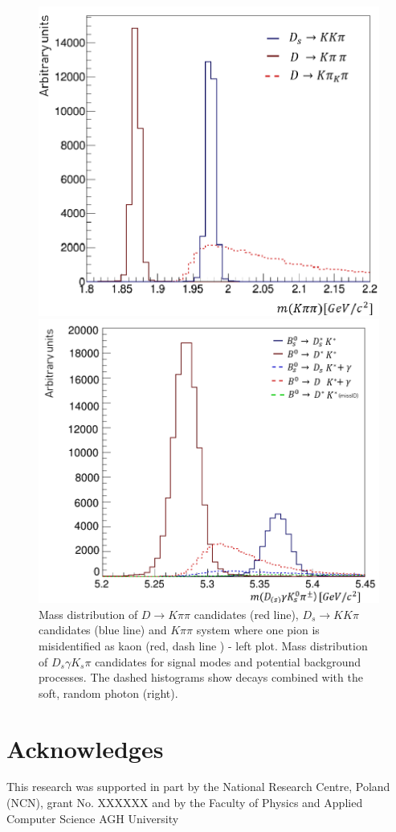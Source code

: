 \documentclass{appolb}
\begin{document}
\begin{figure}[h!]
\begin{minipage}{0.5\textwidth}
  \centering
\includegraphics[width=6.2 cm]{D3.png}
\end{minipage}%
\begin{minipage}{0.5\textwidth}
  \centering
\includegraphics[width= 6.7 cm]{B_new.png}
\end{minipage}%
\caption{Mass distribution of $D \to K \pi \pi$ candidates (red line), $D_s \to K K \pi$ candidates (blue line) and $K\pi\pi$ system where one pion is misidentified as kaon (red, dash line ) - left plot.
Mass distribution of $D_s \gamma K_s \pi$ candidates for signal modes and potential background processes. The dashed histograms show decays combined with the soft, random photon (right).}
\label{Fig:F3}
\end{figure}

\section{Acknowledges}
This research was supported in part by the National Research Centre, Poland
(NCN), grant No. XXXXXX and by the Faculty of Physics and Applied Computer Science AGH University
\end{document}
